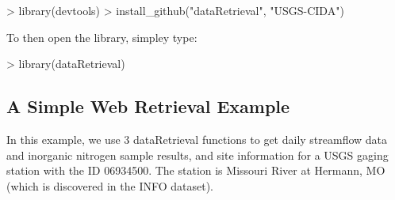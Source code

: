 \documentclass[a4paper,11pt]{article}
\begin{document}
\begin{Schunk}
\begin{Sinput}
> library(devtools)
> install_github("dataRetrieval", "USGS-CIDA")
\end{Sinput}
\end{Schunk}
To then open the library, simpley type:

\begin{Schunk}
\begin{Sinput}
> library(dataRetrieval)
\end{Sinput}
\end{Schunk}

\subsection{A Simple Web Retrieval Example}
In this example, we use 3 dataRetrieval functions to get daily streamflow data and inorganic nitrogen sample results, and site information for a USGS gaging station with the ID 06934500.  The station is Missouri River at Hermann, MO (which is discovered in the INFO dataset).
\end{document}
